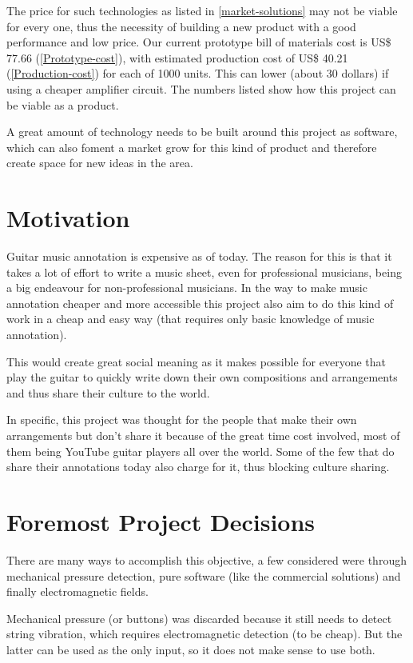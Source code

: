 The price for such technologies as listed in \autoref{market-solutions} may not be viable for every one,
thus the necessity of building a new product with a good performance and low price.
Our current prototype bill of materials cost is US\$ 77.66 (\autoref{Prototype-cost}), with estimated
production cost of US\$ 40.21 (\autoref{Production-cost}) for each of 1000 units. This can lower (about 30 dollars) if using
a cheaper amplifier circuit. The numbers listed show how this project can be viable
as a product. 

A great amount of technology needs to be built around this project as software, which
can also foment a market grow for this kind of product and therefore create space for
new ideas in the area.

\section{Motivation}
Guitar music annotation is expensive as of today. The reason for this is that
it takes a lot of effort to write a music sheet, even for professional musicians,
being a big endeavour for non-professional musicians. In the way to make music annotation
cheaper and more accessible this project also aim to do this kind of work in a cheap
and easy way (that requires only basic knowledge of music annotation). 

This would create great social meaning as it makes possible for everyone that play
the guitar to quickly write down their own compositions and arrangements and thus
share their culture to the world. 

In specific, this project was thought for the people that make their own arrangements
but don't share it because of the great time cost involved, most of them being YouTube
guitar players all over the world. Some of the few that do share their annotations today
also charge for it, thus blocking culture sharing. 

\section{Foremost Project Decisions}
There are many ways to accomplish this objective, a few considered were through
mechanical pressure detection, pure software (like the commercial solutions) and
finally electromagnetic fields. 

Mechanical pressure (or buttons) was discarded because it still needs to detect
string vibration, which requires electromagnetic detection (to be cheap). But the latter can
be used as the only input, so it does not make sense to use both. 

